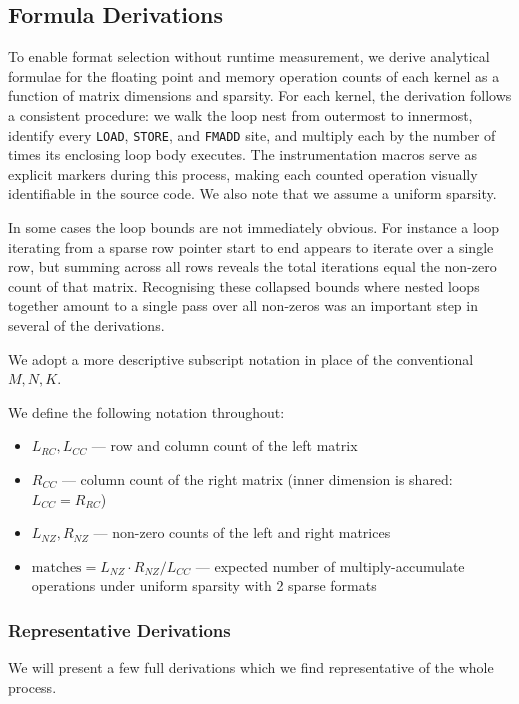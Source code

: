 \documentclass[sigconf, review, anonymous]{acmart}
\begin{document}
\subsection{Formula Derivations}
To enable format selection without runtime measurement, we derive analytical formulae for the floating point and memory operation counts of each kernel as a function of matrix dimensions and sparsity. For each kernel, the derivation follows a consistent procedure: we walk the loop nest from outermost to innermost, identify every \texttt{LOAD}, \texttt{STORE}, and \texttt{FMADD} site, and multiply each by the number of times its enclosing loop body executes. The instrumentation macros serve as explicit markers during this process, making each counted operation visually identifiable in the source code. We also note that we assume a uniform sparsity.

In some cases the loop bounds are not immediately obvious. For instance a loop iterating from a sparse row pointer start to end appears to iterate over a single row, but summing across all rows reveals the total iterations equal the non-zero count of that matrix. Recognising these collapsed bounds where nested loops together amount to a single pass over all non-zeros was an important step in several of the derivations.

We adopt a more descriptive subscript notation in place of the conventional $M, N, K$.

We define the following notation throughout:
\begin{itemize}
    \item $L_{RC}, L_{CC}$ --- row and column count of the left matrix
    \item $R_{CC}$ --- column count of the right matrix (inner dimension is shared: $L_{CC} = R_{RC}$)
    \item $L_{NZ}, R_{NZ}$ --- non-zero counts of the left and right matrices
    \item $\text{matches} = L_{NZ} \cdot R_{NZ} / L_{CC}$ --- expected number of multiply-accumulate operations under uniform sparsity with 2 sparse formats
\end{itemize}
\subsubsection*{Representative Derivations}
We will present a few full derivations which we find representative of the whole process.
\end{document}
